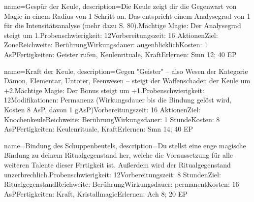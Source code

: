 {
    name={Gespür der Keule},
    description={Die Keule zeigt dir die Gegenwart von Magie in einem Radius von 1 Schritt an. Das entspricht einem Analysegrad von 1 für die Intensitätsanalyse (mehr dazu S. 80).\newline Mächtige Magie: Der Analysegrad steigt um 1.\newline Probenschwierigkeit: 12\newline Vorbereitungszeit: 16 Aktionen\newline Ziel: Zone\newline Reichweite: Berührung\newline Wirkungsdauer: augenblicklich\newline Kosten: 1 AsP\newline Fertigkeiten: Geister rufen, Keulenrituale, Kraft\newline Erlernen: Smn 12; 40 EP}
}


{
    name={Kraft der Keule},
    description={Gegen "Geister" – also Wesen der Kategorie Dämon, Elementar, Untoter, Feenwesen – steigt der Waffenschaden der Keule um +2.\newline Mächtige Magie: Der Bonus steigt um +1.\newline Probenschwierigkeit: 12\newline Modifikationen: Permanenz (Wirkungsdauer bis die Bindung gelöst wird, Kosten 8 AsP, davon 1 gAsP)\newline Vorbereitungszeit: 16 Aktionen\newline Ziel: Knochenkeule\newline Reichweite: Berührung\newline Wirkungsdauer: 1 Stunde\newline Kosten: 8 AsP\newline Fertigkeiten: Keulenrituale, Kraft\newline Erlernen: Smn 14; 40 EP}
}


{
    name={Bindung des Schuppenbeutels},
    description={Du stellst eine enge magische Bindung zu deinem Ritualgegenstand her, welche die Voraussetzung für alle weiteren Talente dieser Fertigkeit ist. Außerdem wird der Ritualgegenstand unzerbrechlich.\newline Probenschwierigkeit: 12\newline Vorbereitungszeit: 8 Stunden\newline Ziel: Ritualgegenstand\newline Reichweite: Berührung\newline Wirkungsdauer: permanent\newline Kosten: 16 AsP\newline Fertigkeiten: Kraft, Kristallmagie\newline Erlernen: Ach 8; 20 EP}
}


